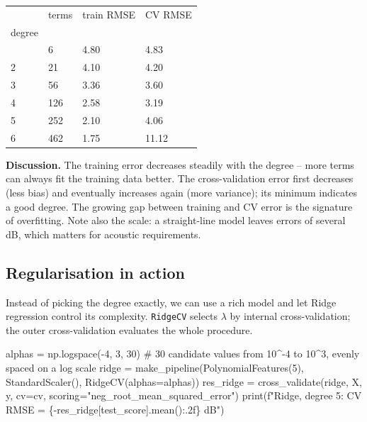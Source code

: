 \documentclass[
  letterpaper,
  DIV=11,
  numbers=noendperiod]{scrreprt}
\newenvironment{Shaded}{\begin{snugshade}}{\end{snugshade}}
\newcommand{\BuiltInTok}[1]{\textcolor[rgb]{0.00,0.23,0.31}{#1}}
\newcommand{\CommentTok}[1]{\textcolor[rgb]{0.37,0.37,0.37}{#1}}
\newcommand{\DecValTok}[1]{\textcolor[rgb]{0.68,0.00,0.00}{#1}}
\newcommand{\NormalTok}[1]{\textcolor[rgb]{0.00,0.23,0.31}{#1}}
\newcommand{\OperatorTok}[1]{\textcolor[rgb]{0.37,0.37,0.37}{#1}}
\newcommand{\SpecialCharTok}[1]{\textcolor[rgb]{0.37,0.37,0.37}{#1}}
\newcommand{\SpecialStringTok}[1]{\textcolor[rgb]{0.13,0.47,0.30}{#1}}
\newcommand{\StringTok}[1]{\textcolor[rgb]{0.13,0.47,0.30}{#1}}
\begin{document}
\begin{longtable}[]{@{}llll@{}}
\toprule\noalign{}
& terms & train RMSE & CV RMSE \\
degree & & & \\
\midrule\noalign{}
\endhead
\bottomrule\noalign{}
\endlastfoot
1 & 6 & 4.80 & 4.83 \\
2 & 21 & 4.10 & 4.20 \\
3 & 56 & 3.36 & 3.60 \\
4 & 126 & 2.58 & 3.19 \\
5 & 252 & 2.10 & 4.06 \\
6 & 462 & 1.75 & 11.12 \\
\end{longtable}

\textbf{Discussion.} The training error decreases steadily with the
degree -- more terms can always fit the training data better. The
cross-validation error first decreases (less bias) and eventually
increases again (more variance); its minimum indicates a good degree.
The growing gap between training and CV error is the signature of
overfitting. Note also the scale: a straight-line model leaves errors of
several dB, which matters for acoustic requirements.

\subsection{Regularisation in action}\label{regularisation-in-action}

Instead of picking the degree exactly, we can use a rich model and let
Ridge regression control its complexity. \texttt{RidgeCV} selects
\(\lambda\) by internal cross-validation; the outer cross-validation
evaluates the whole procedure.

\begin{Shaded}
\begin{Highlighting}[]
\NormalTok{alphas }\OperatorTok{=}\NormalTok{ np.logspace(}\OperatorTok{{-}}\DecValTok{4}\NormalTok{, }\DecValTok{3}\NormalTok{, }\DecValTok{30}\NormalTok{)        }\CommentTok{\# 30 candidate values from 10\^{}{-}4 to 10\^{}3, evenly spaced on a log scale}
\NormalTok{ridge }\OperatorTok{=}\NormalTok{ make\_pipeline(PolynomialFeatures(}\DecValTok{5}\NormalTok{), StandardScaler(), RidgeCV(alphas}\OperatorTok{=}\NormalTok{alphas))}
\NormalTok{res\_ridge }\OperatorTok{=}\NormalTok{ cross\_validate(ridge, X, y, cv}\OperatorTok{=}\NormalTok{cv, scoring}\OperatorTok{=}\StringTok{"neg\_root\_mean\_squared\_error"}\NormalTok{)}
\BuiltInTok{print}\NormalTok{(}\SpecialStringTok{f"Ridge, degree 5: CV RMSE = }\SpecialCharTok{\{}\OperatorTok{{-}}\NormalTok{res\_ridge[}\StringTok{\textquotesingle{}test\_score\textquotesingle{}}\NormalTok{]}\SpecialCharTok{.}\NormalTok{mean()}\SpecialCharTok{:.2f\}}\SpecialStringTok{ dB"}\NormalTok{)}
\end{Highlighting}
\end{Shaded}
\end{document}
